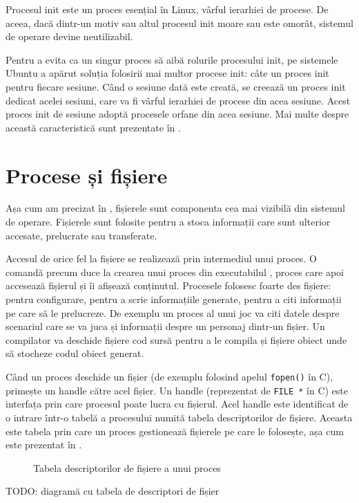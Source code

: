 Procesul init este un proces esențial în Linux, vârful ierarhiei de procese. De
aceea, dacă dintr-un motiv sau altul procesul init moare sau este omorât,
sistemul de operare devine neutilizabil.

Pentru a evita ca un singur proces să aibă rolurile procesului init, pe
sistemele Ubuntu a apărut soluția folosirii mai multor procese init: câte un
proces init pentru fiecare sesiune. Când o sesiune dată este creată, se creează
un proces init dedicat acelei sesiuni, care va fi vârful ierarhiei de procese
din acea sesiune. Acest proces init de sesiune adoptă procesele orfane din acea
sesiune. Mai multe despre această caracteristică sunt prezentate în .

\section{Procese și fișiere}
\label{sec:procese-fisiere}

Așa cum am precizat în ,
fișierele sunt componenta cea mai vizibilă din sistemul de operare. Fișierele
sunt folosite pentru a stoca informații care sunt ulterior accesate, prelucrate
sau transferate.

Accesul de orice fel la fișiere se realizează prin intermediul unui proces. O
comandă precum  duce la crearea unui proces din executabilul ,
proces care apoi accesează fișierul  și îi afișează conținutul. Procesele
folosesc foarte des fișiere: pentru configurare, pentru a scrie informațiile
generate, pentru a citi informații pe care să le prelucreze. De exemplu un
proces al unui joc va citi datele despre scenariul care se va juca și informații
despre un personaj dintr-un fișier. Un compilator va deschide fișiere cod sursă
pentru a le compila și fișiere obiect unde să stocheze codul obiect generat.

Când un proces deschide un fișier (de exemplu folosind apelul \texttt{fopen()} în C),
primește un handle către acel fișier. Un handle (reprezentat de \texttt{FILE *} în C)
este interfața prin care procesul poate lucra cu fișierul. Acel handle este
identificat de o intrare într-o tabelă a procesului numită tabela descriptorilor
de fișiere. Aceasta este tabela prin care un proces gestionează fișierele pe
care le folosește, așa cum este prezentat în .

\begin{figure}[!htbp]
	\centering
        \def\svgwidth{0.8\textwidth}
        
        \caption{Tabela descriptorilor de fișiere a unui proces}
        \label{fig:process-fdtab}
\end{figure}
TODO: diagramă cu tabela de descriptori de fișier

